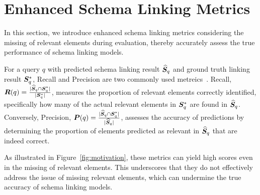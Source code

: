 

\section{Enhanced Schema Linking Metrics}
\label{sec: Enhanced Schema Linking Metrics}
In this section, we introduce enhanced schema linking metrics considering the missing of relevant elements during evaluation, thereby accurately assess the true performance of schema linking models.

For a query $q$ with predicted schema linking result $\widehat{{\bm{S}}}_q$ and ground truth linking result ${\bm{S}}^*_q$, Recall and Precision are two commonly used metreics~\citep{li2023resdsql,li2024codes,qu2024before}. Recall, ${\bm{R}}(q) =\frac{|\widehat{{\bm{S}}}_q \cap {\bm{S}}^*_q|}{|{\bm{S}}^*_q|}$,  measures the proportion of relevant elements correctly identified, specifically how many of the actual relevant elements in ${\bm{S}}^*_q$ are found in $\widehat{{\bm{S}}}_q$. Conversely, Precision, ${\bm{P}}(q) = \frac{|\widehat{{\bm{S}}}_q \cap {\bm{S}}^*_q|}{|\widehat{{\bm{S}}}_q|}$, assesses the accuracy of predictions by determining the proportion of elements predicted as relevant in $\widehat{{\bm{S}}}_q$ that are indeed correct.

As illustrated in Figure~\ref{fig:motivation}, these metrics can yield high scores even in the missing of relevant elements. This underscores that they do not effectively address the issue of missing relevant elements, which can undermine the true accuracy of schema linking models.

